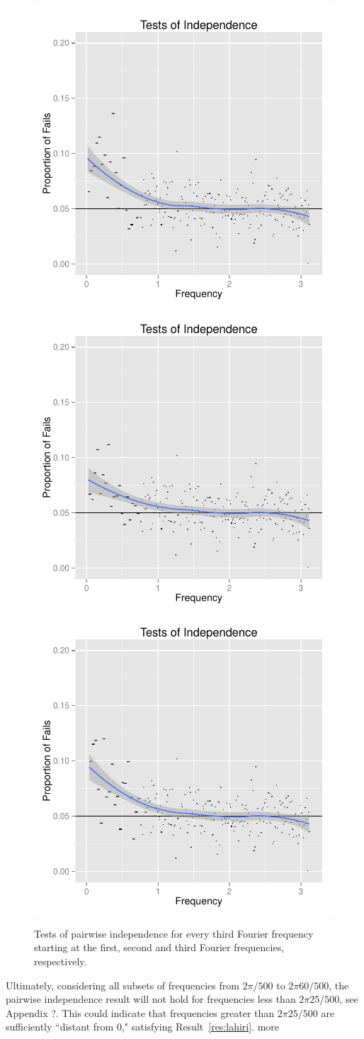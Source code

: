 \documentclass{article}\usepackage{graphicx, color}
\newenvironment{knitrout}{}{} %
\newcommand{\mj}[1]{{\color{blue} #1}}
\theoremstyle{plain}
\begin{document}
\begin{knitrout}
\color{fgcolor}\begin{figure}[H]

\includegraphics[width=.33\textwidth]{figure/space2-ar41} 
\includegraphics[width=.33\textwidth]{figure/space2-ar42} 
\includegraphics[width=.33\textwidth]{figure/space2-ar43} \caption[Tests of pairwise independence for every third Fourier frequency starting at the first, second and third Fourier frequencies, respectively]{Tests of pairwise independence for every third Fourier frequency starting at the first, second and third Fourier frequencies, respectively.\label{fig:space2-ar4}}
\end{figure}


\end{knitrout}


Ultimately, considering all subsets of frequencies from $2\pi/500$ to $2\pi 60/500$, the pairwise independence result will not hold for frequencies less than $2\pi 25/500$, see Appendix ?. This could indicate that frequencies greater than $2 \pi 25/500$ are sufficiently ``distant from 0," satisfying Result~\ref{res:lahiri}. \mj{more}
\end{document}
